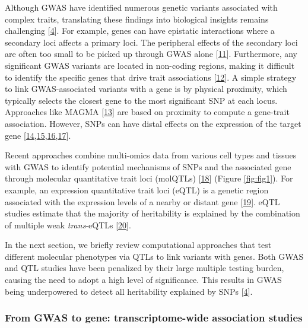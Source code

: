 Although GWAS have identified numerous genetic variants associated with complex traits, translating these findings into biological insights remains challenging {[}\protect\hyperlink{ref-17B4AigZT}{4}{]}.
For example, genes can have epistatic interactions where a secondary loci affects a primary loci.
The peripheral effects of the secondary loci are often too small to be picked up through GWAS alone {[}\protect\hyperlink{ref-IrGVpNji}{11}{]}.
Furthermore, any significant GWAS variants are located in non-coding regions, making it difficult to identify the specific genes that drive trait associations {[}\protect\hyperlink{ref-BqjxxhyF}{12}{]}.
A simple strategy to link GWAS-associated variants with a gene is by physical proximity, which typically selects the closest gene to the most significant SNP at each locus.
Approaches like MAGMA {[}\protect\hyperlink{ref-19XiXgYmd}{13}{]} are based on proximity to compute a gene-trait association.
However, SNPs can have distal effects on the expression of the target gene {[}\protect\hyperlink{ref-9Pr9idng}{14},\protect\hyperlink{ref-OBxYzUMh}{15},\protect\hyperlink{ref-167QL5tMV}{16},\protect\hyperlink{ref-WfdUHVDA}{17}{]}.

Recent approaches combine multi-omics data from various cell types and tissues with GWAS to identify potential mechanisms of SNPs and the associated gene through molecular quantitative trait loci (molQTLs) {[}\protect\hyperlink{ref-QIEm5ZWK}{18}{]} (Figure \ref{fig:fig1}).
For example, an expression quantitative trait loci (eQTL) is a genetic region associated with the expression levels of a nearby or distant gene {[}\protect\hyperlink{ref-1FHKg3JK5}{19}{]}.
eQTL studies estimate that the majority of heritability is explained by the combination of multiple weak \emph{trans}-eQTLs {[}\protect\hyperlink{ref-sGgkLsyy}{20}{]}.

In the next section, we briefly review computational approaches that test different molecular phenotypes via QTLs to link variants with genes.
Both GWAS and QTL studies have been penalized by their large multiple testing burden, causing the need to adopt a high level of significance.
This results in GWAS being underpowered to detect all heritability explained by SNPs {[}\protect\hyperlink{ref-17B4AigZT}{4}{]}.

\hypertarget{from-gwas-to-gene-transcriptome-wide-association-studies}{%
\subsubsection{From GWAS to gene: transcriptome-wide association studies}\label{from-gwas-to-gene-transcriptome-wide-association-studies}}

